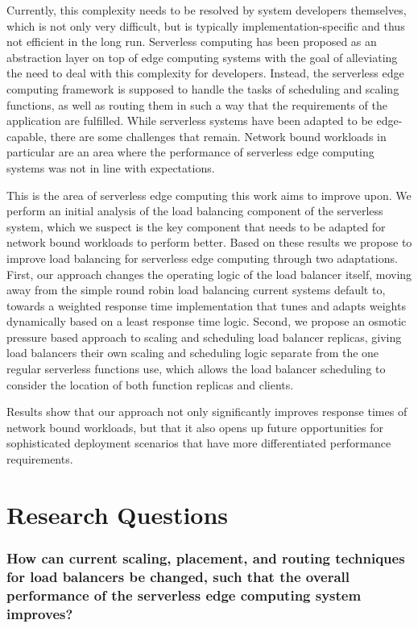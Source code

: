 \documentclass[draft,final]{vutinfth} %
\providecommand{\DIFaddtex}[1]{{\protect\color{blue}\uwave{#1}}} %
\providecommand{\DIFaddbegin}{} %
\providecommand{\DIFaddend}{} %
\providecommand{\DIFadd}[1]{\texorpdfstring{\DIFaddtex{#1}}{#1}} %
\begin{document}
Currently, this complexity needs to be resolved by system developers themselves, which is not only very difficult, but is typically implementation-specific and thus not efficient in the long run.
Serverless computing has been proposed as an abstraction layer on top of edge computing systems with the goal of alleviating the need to deal with this complexity for developers.
Instead, the serverless edge computing framework is supposed to handle the tasks of scheduling and scaling functions, as well as routing them in such a way that the requirements of the application are fulfilled.
While serverless systems have been adapted to be edge-capable, there are some challenges that remain.
Network bound workloads in particular are an area where the performance of serverless edge computing systems was not in line with expectations.

This is the area of serverless edge computing this work aims to improve upon.
We perform an initial analysis of the load balancing component of the serverless system, which we suspect is the key component that needs to be adapted for network bound workloads to perform better.
Based on these results we propose to improve load balancing for serverless edge computing through two adaptations.
First, our approach changes the operating logic of the load balancer itself, moving away from the simple round robin load balancing current systems default to, towards a weighted response time implementation that tunes and adapts weights dynamically based on a least response time logic.
Second, we propose an osmotic pressure based approach to scaling and scheduling load balancer replicas, giving load balancers their own scaling and scheduling logic separate from the one regular serverless functions use, which allows the load balancer scheduling to consider the location of both function replicas and clients.

Results show that our approach not only significantly improves response times \DIFaddbegin \DIFadd{and network traffic }\DIFaddend of network bound workloads, but that it also opens up future opportunities for sophisticated deployment scenarios that have more differentiated performance requirements.

\section{Research Questions}

\subsubsection{How can current scaling, placement, and routing techniques for load balancers be changed, such that the overall performance of the serverless edge computing system improves?}
\end{document}
